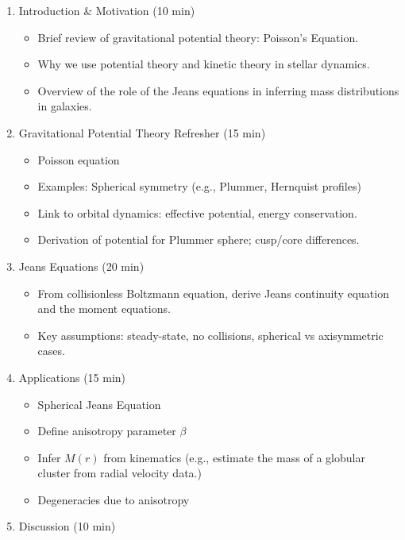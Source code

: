 \begin{itemize}
\begin{enumerate}
  \item Introduction \& Motivation (10 min)
    \begin{itemize}
      \item Brief review of gravitational potential theory: Poisson's Equation.
      \item Why we use potential theory and kinetic theory in stellar dynamics.
      \item Overview of the role of the Jeans equations in inferring mass distributions in galaxies.
    \end{itemize}
  \item Gravitational Potential Theory Refresher (15 min)
    \begin{itemize}
    \item Poisson equation
    \item Examples: Spherical symmetry (e.g., Plummer, Hernquist profiles)
    \item Link to orbital dynamics: effective potential, energy conservation.
      \item Derivation of potential for Plummer sphere; cusp/core differences.
    \end{itemize}
  \item Jeans Equations (20 min)
    \begin{itemize}
      \item From collisionless Boltzmann equation, derive Jeans
        continuity equation and the moment equations.
        \item Key assumptions: steady-state, no collisions, spherical
          vs axisymmetric cases. 
      \end{itemize}
    \item Applications (15 min)
      \begin{itemize}
      \item Spherical Jeans Equation
      \item Define anisotropy parameter $\beta$
      \item Infer $M(r)$ from kinematics (e.g., estimate the mass of a globular cluster from radial velocity data.)
      \item Degeneracies due to anisotropy
        \end{itemize}
  \item Discussion (10 min)
  \end{enumerate}

\end{itemize} 



